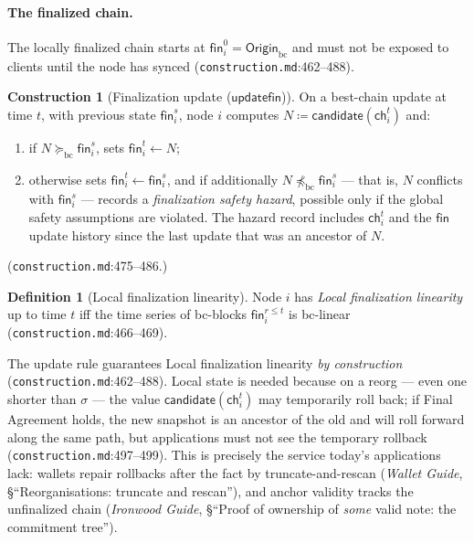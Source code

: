 \documentclass[11pt,a4paper]{article}
\theoremstyle{definition}
\newtheorem{definition}[theorem]{Definition}
\newtheorem{construction}[theorem]{Construction}
\begin{document}
\paragraph{The finalized chain.} The locally finalized chain starts at
$\mathsf{fin}_i^0 = \mathsf{Origin}_{\mathrm{bc}}$ and must not be
exposed to clients until the node has synced
(\texttt{construction.md}:462--488).

\begin{construction}[Finalization update
($\mathsf{updatefin}$)]\label{def:xl-updatefin}
On a best-chain update at time $t$, with previous state
$\mathsf{fin}_i^s$, node $i$ computes $N \coloneqq
\mathsf{candidate}(\mathsf{ch}_i^t)$ and:
\begin{enumerate}[label=(\roman*)]
\item if $N \succeq_{\mathrm{bc}} \mathsf{fin}_i^s$, sets
  $\mathsf{fin}_i^t \leftarrow N$;
\item otherwise sets $\mathsf{fin}_i^t \leftarrow \mathsf{fin}_i^s$, and
  if additionally $N \not\preceq_{\mathrm{bc}} \mathsf{fin}_i^s$ --- that
  is, $N$ conflicts with $\mathsf{fin}_i^s$ --- records a
  \emph{finalization safety hazard}, possible only if the global safety
  assumptions are violated. The hazard record includes $\mathsf{ch}_i^t$
  and the $\mathsf{fin}$ update history since the last update that was an
  ancestor of $N$.
\end{enumerate}
(\texttt{construction.md}:475--486.)
\end{construction}

\begin{definition}[Local finalization linearity]\label{def:xl-lfl}
Node $i$ has \emph{Local finalization linearity} up to time $t$ iff the
time series of bc-blocks $\mathsf{fin}_i^{r \le t}$ is bc-linear
(\texttt{construction.md}:466--469).
\end{definition}

The update rule guarantees Local finalization linearity \emph{by
construction} (\texttt{construction.md}:462--488). Local state is needed
because on a reorg --- even one shorter than $\sigma$ --- the value
$\mathsf{candidate}(\mathsf{ch}_i^t)$ may temporarily roll back; if Final
Agreement holds, the new snapshot is an ancestor of the old and will roll
forward along the same path, but applications must not see the temporary
rollback (\texttt{construction.md}:497--499). This is precisely the
service today's applications lack: wallets repair rollbacks after the
fact by truncate-and-rescan (\emph{Wallet Guide}, \S``Reorganisations:
truncate and rescan''), and anchor validity tracks the unfinalized chain
(\emph{Ironwood Guide}, \S``Proof of ownership of \emph{some} valid note:
the commitment tree'').
\end{document}
